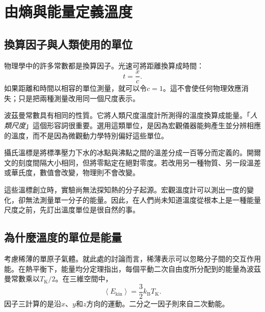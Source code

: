\chapter{由熵與能量定義溫度}


\section{換算因子與人類使用的單位}

物理學中的許多常數都是換算因子。光速可將距離換算成時間：
\begin{equation}
 t=\frac{x}{c}.
\end{equation}
如果距離和時間以相容的單位測量，就可以令\(c=1\)。這不會使任何物理效應消失；只是把兩種測量改用同一個尺度表示。

波茲曼常數具有相同的性質。它將人類尺度溫度計所測得的溫度換算成能量。「\emph{人類尺度}」這個形容詞很重要。選用這類單位，是因為宏觀儀器能夠產生並分辨相應的溫度，而不是因為微觀動力學特別偏好這些單位。

攝氏溫標是將標準壓力下水的冰點與沸點之間的溫差分成一百等分而定義的。開爾文的刻度間隔大小相同，但將零點定在絕對零度。若改用另一種物質、另一段溫差或華氏度，數值會改變，物理則不會改變。

\begin{classroomqa}
\end{classroomqa}

這些溫標創立時，實驗尚無法探知熱的分子起源。宏觀溫度計可以測出一度的變化，卻無法測量單一分子的能量。因此，在人們尚未知道溫度從根本上是一種能量尺度之前，先訂出溫度單位是很自然的事。

\section{為什麼溫度的單位是能量}

考慮稀薄的單原子氣體。就此處的討論而言，稀薄表示可以忽略分子間的交互作用能。在熱平衡下，能量均分定理指出，每個平動二次自由度所分配到的能量為波茲曼常數乘以\(T_{\mathrm K}/2\)。在三維空間中，
\begin{equation}
 \left\langle E_{\mathrm{kin}}\right\rangle
 =\frac{3}{2}k_{\mathrm B}T_{\mathrm K}.
 \label{eq:sm2-equipartition-kelvin}
\end{equation}
因子三計算的是沿\(x\)、\(y\)和\(z\)方向的運動。二分之一因子則來自二次動能。

